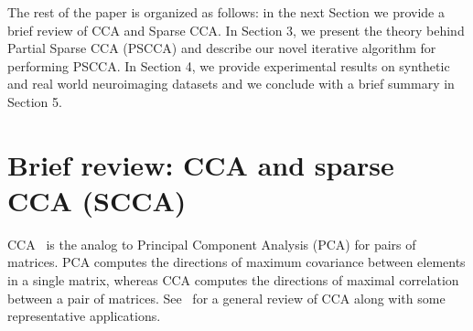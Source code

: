 \documentclass{llncs}
\newcommand{\X}{{\bf X}}
\newcommand{\y}{{\bf y}}
\begin{document}
The rest of the paper is organized as follows: in the next Section we
provide a brief review of CCA and Sparse CCA. In Section 3, we present
the theory behind Partial Sparse CCA (PSCCA) and describe our novel
iterative algorithm for performing PSCCA. In Section 4, we provide
experimental results on synthetic and real world neuroimaging datasets
and we conclude with a brief summary in Section 5.




\section{Brief review: CCA and sparse CCA (SCCA)}

CCA~\cite{hotellingcca} is the analog to Principal Component Analysis
(PCA) for pairs of matrices. PCA computes the directions of maximum
covariance between elements in a single matrix, whereas CCA computes
the directions of maximal correlation between a pair of matrices.
See~\cite{taylor:cca} for a general review of CCA along with some
representative applications.  %
\end{document}
